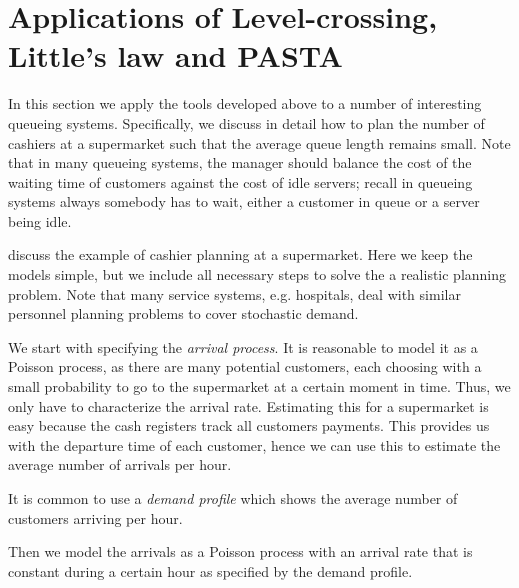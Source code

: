 \documentclass[queueing-book.tex]{subfiles}
\begin{document}
\section{Applications of Level-crossing, Little's law and PASTA}
\label{sec:mnmn1}

In this section we apply the tools developed above to a number of interesting queueing systems.
Specifically, we discuss in detail how to plan the number of cashiers at a supermarket such that the average queue length remains small.
Note that in many queueing systems, the manager should balance the cost of the waiting time of customers against the cost of idle servers; recall in queueing systems always somebody has to wait, either a customer in queue or a server being idle.





 discuss the example of cashier planning at a supermarket.
Here we keep the models simple, but we include all necessary steps to solve the a realistic planning problem.
Note that many service systems, e.g.
hospitals, deal with similar personnel planning problems to cover stochastic demand.


We start with specifying the \emph{arrival process}.
It is reasonable to model it as a Poisson process, as there are many potential customers, each choosing with a small probability to go to the supermarket at a certain moment in time.
Thus, we only have to characterize the arrival rate.
Estimating this for a supermarket is easy because the cash registers track all customers payments.  This provides us with the departure time of each customer, hence we can use this to estimate the average number of arrivals per hour.

It is common to use a \emph{demand profile} which shows the average number of customers arriving per hour.
\begin{marginfigure}
\caption{A demand profile.}
\label{fig:loadprofile}
\end{marginfigure}
Then we model the arrivals as a Poisson process with an arrival rate that is constant during a certain hour as specified by the demand profile.
\end{document}
